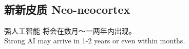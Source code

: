 \newcommand{\logic}[1]{{\color{violet}{\textit{#1}}}}
\newcommand{\underconst}{\texttt{[image: ../2020/UnderConst.png]}}
\newcommand{\KBsymbol}{\vcenter{\hbox{\texttt{[image: ../KB-symbol.png]}}}}
\newcommand{\token}{\vcenter{\hbox{\texttt{[image: token.png]}}}}
\newcommand{\proposition}{\vcenter{\hbox{\texttt{[image: proposition.png]}}}}

\newcommand{\circled}[1]{{\textcircled{\sffamily \scriptsize{#1}}}}

\newcommand{\egg}[1]{\footnotesize #1 \normalsize}

\setcounter{secnumdepth}{0}		%



\begin{preview}

\title{\vspace{-1.5cm} \bfseries\color{blue}{\LARGE Global AGI Project}}

\date{\vspace{-2cm}} %

\setcounter{section}{-1}
\setcounter{mypage}{1}


%

\begin{minipage}{\textwidth}
\setlength{\parskip}{0.4\baselineskip}
\section{新新皮质 \quad \quad \small{Neo-neocortex}}

强人工智能 将会在数月～一两年内出现。\\
\egg{Strong AI may arrive in 1-2 years or even within months.}


\end{minipage}
\end{preview}
